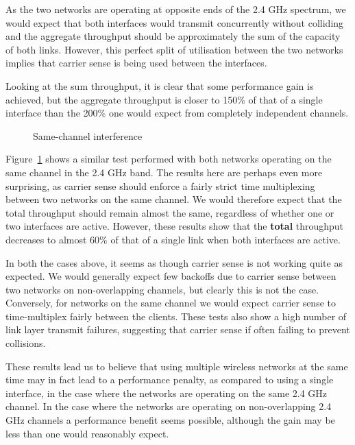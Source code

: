 As the two networks are operating at opposite ends of the 2.4 GHz spectrum, we
would expect that both interfaces would transmit concurrently without colliding
and the aggregate throughput should be approximately the sum of the capacity of
both links. However, this perfect split of utilisation between the two networks
implies that carrier sense is being used between the interfaces.

Looking at the sum throughput, it is clear that some performance gain is
achieved, but the aggregate throughput is closer to 150\% of that of a single
interface than the 200\% one would expect from completely independent channels.

\begin{figure}[h]
 \centering
 
 \caption{Same-channel interference}\label{graph:sc-interference}
\end{figure}

Figure~\ref{graph:sc-interference} shows a similar test performed with both
networks operating on the same channel in the 2.4 GHz band. The results here are
perhaps even more surprising, as carrier sense should enforce a fairly strict
time multiplexing between two networks on the same channel. We would therefore
expect that the total throughput should remain almost the same, regardless of
whether one or two interfaces are active. However, these results show that the
\textbf{total} throughput decreases to almost 60\% of that of a single link when
both interfaces are active.

In both the cases above, it seems as though carrier sense is not working quite
as expected. We would generally expect few backoffs due to carrier sense between
two networks on non-overlapping channels, but clearly this is not the case.
Conversely, for networks on the same channel we would expect carrier sense to
time-multiplex fairly between the clients. These tests also show a high number
of link layer transmit failures, suggesting that carrier sense if often failing
to prevent collisions.

These results lead us to believe that using multiple wireless networks at the
same time may in fact lead to a performance penalty, as compared to using a
single interface, in the case where the networks are operating on the same 2.4
GHz channel. In the case where the networks are operating on non-overlapping 2.4
GHz channels a performance benefit seems possible, although the gain may be less
than one would reasonably expect.


